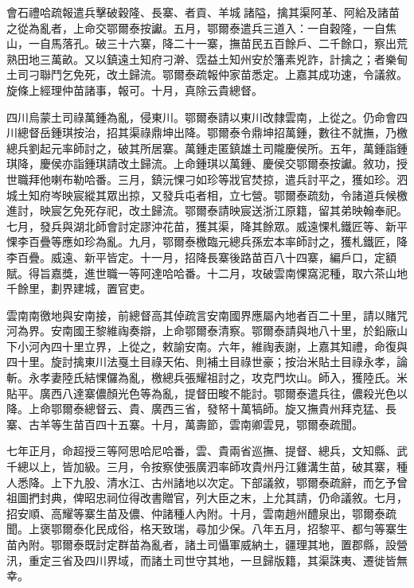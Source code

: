 \begin{pinyinscope}
會石禮哈疏報遣兵擊破穀隆、長寨、者貢、羊城諸隘，擒其渠阿革、阿給及諸苗之從為亂者，上命交鄂爾泰按讞。五月，鄂爾泰遣兵三道入：一自穀隆，一自焦山，一自馬落孔。破三十六寨，降二十一寨，撫苗民五百餘戶、二千餘口，察出荒熟田地三萬畝。又以鎮遠土知府刁澣、霑益土知州安於籓素兇詐，計擒之；者樂甸土司刁聯鬥乞免死，改土歸流。鄂爾泰疏報仲家苗悉定。上嘉其成功速，令議敘。旋條上經理仲苗諸事，報可。十月，真除云貴總督。

四川烏蒙土司祿萬鍾為亂，侵東川。鄂爾泰請以東川改隸雲南，上從之。仍命會四川總督岳鍾琪按治，招其渠祿鼎坤出降。鄂爾泰令鼎坤招萬鍾，數往不就撫，乃檄總兵劉起元率師討之，破其所居寨。萬鍾走匿鎮雄土司隴慶侯所。五年，萬鍾詣鍾琪降，慶侯亦詣鍾琪請改土歸流。上命鍾琪以萬鍾、慶侯交鄂爾泰按讞。敘功，授世職拜他喇布勒哈番。三月，鎮沅惈刁如珍等戕官焚掠，遣兵討平之，獲如珍。泗城土知府岑映宸縱其眾出掠，又發兵屯者相，立七營。鄂爾泰疏劾，令諸道兵候檄進討，映宸乞免死存祀，改土歸流。鄂爾泰請映宸送浙江原籍，留其弟映翰奉祀。七月，發兵與湖北師會討定謬沖花苗，獲其渠，降其餘眾。威遠惈札鐵匠等、新平惈李百疊等應如珍為亂。九月，鄂爾泰檄臨元總兵孫宏本率師討之，獲札鐵匠，降李百疊。威遠、新平皆定。十一月，招降長寨後路苗百八十四寨，編戶口，定額賦。得旨嘉獎，進世職一等阿達哈哈番。十二月，攻破雲南惈窩泥種，取六茶山地千餘里，劃界建城，置官吏。

雲南南徼地與安南接，前總督高其倬疏言安南國界應屬內地者百二十里，請以賭咒河為界。安南國王黎維祹奏辯，上命鄂爾泰清察。鄂爾泰請與地八十里，於鉛廠山下小河內四十里立界，上從之，敕諭安南。六年，維祹表謝，上嘉其知禮，命復與四十里。旋討擒東川法戛土目祿天佑、則補土目祿世豪；按治米貼土目祿永孝，論斬。永孝妻陸氏結惈儸為亂，檄總兵張耀祖討之，攻克門坎山。師入，獲陸氏。米貼平。廣西八達寨儂顏光色等為亂，提督田畯不能討。鄂爾泰遣兵往，儂殺光色以降。上命鄂爾泰總督云、貴、廣西三省，發帑十萬犒師。旋又撫貴州拜克猛、長寨、古羊等生苗百四十五寨。十月，萬壽節，雲南卿雲見，鄂爾泰疏聞。

七年正月，命超授三等阿思哈尼哈番，雲、貴兩省巡撫、提督、總兵，文知縣、武千總以上，皆加級。三月，令按察使張廣泗率師攻貴州丹江雞溝生苗，破其寨，種人悉降。上下九股、清水江、古州諸地以次定。下部議敘，鄂爾泰疏辭，而乞予曾祖圖捫封典，俾昭忠祠位得改書贈官，列大臣之末，上允其請，仍命議敘。七月，招安順、高耀等寨生苗及儂、仲諸種人內附。十月，雲南趙州醴泉出，鄂爾泰疏聞。上褒鄂爾泰化民成俗，格天致瑞，尋加少保。八年五月，招黎平、都勻等寨生苗內附。鄂爾泰既討定群苗為亂者，諸土司懾軍威納土，疆理其地，置郡縣，設營汛，重定三省及四川界域，而諸土司世守其地，一旦歸版籍，其渠誅夷、遷徙皆無幸。


\end{pinyinscope}
